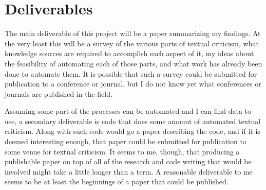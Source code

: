 \documentclass[onecolumn, 11pt]{article}
\begin{document}
\section{Deliverables}

The main deliverable of this project will be a paper summarizing my findings.
At the very least this will be a survey of the various parts of textual
criticism, what knowledge sources are required to accomplish each aspect of it,
my ideas about the feasibility of automating each of those parts, and what work
has already been done to automate them.  It is possible that such a survey
could be submitted for publication to a conference or journal, but I do not
know yet what conferences or journals are published in the field.

Assuming some part of the processes can be automated and I can find data to
use, a secondary deliverable is code that does some amount of automated textual
criticism.  Along with such code would go a paper describing the code, and if
it is deemed interesting enough, that paper could be submitted for publication
to some venue for textual criticism.  It seems to me, though, that producing a
publishable paper on top of all of the research and code writing that would be
involved might take a little longer than a term.  A reasonable deliverable to
me seems to be at least the beginnings of a paper that could be published.
\end{document}
